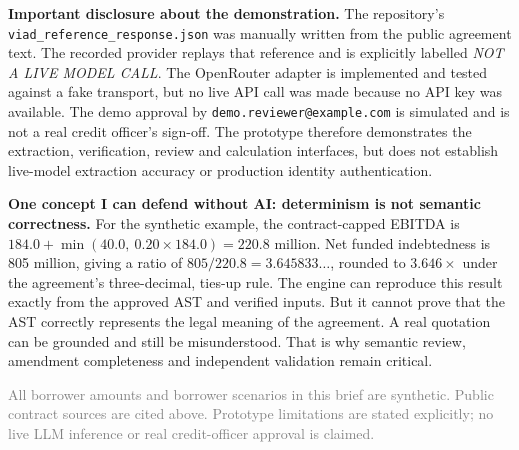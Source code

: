 \documentclass[10pt,letterpaper]{article}
\newcommand{\ct}[1]{\texttt{\small #1}}
\begin{document}
\textbf{Important disclosure about the demonstration.} The repository's \ct{viad\_reference\_response.json} was manually written from the public agreement text. The recorded provider replays that reference and is explicitly labelled \emph{NOT A LIVE MODEL CALL}. The OpenRouter adapter is implemented and tested against a fake transport, but no live API call was made because no API key was available. The demo approval by \ct{demo.reviewer@example.com} is simulated and is not a real credit officer's sign-off. The prototype therefore demonstrates the extraction, verification, review and calculation interfaces, but does not establish live-model extraction accuracy or production identity authentication.

\textbf{One concept I can defend without AI: determinism is not semantic correctness.} For the synthetic example, the contract-capped EBITDA is $184.0+\min(40.0,\ 0.20\times184.0)=220.8$ million. Net funded indebtedness is 805 million, giving a ratio of $805/220.8=3.645833\ldots$, rounded to $3.646\times$ under the agreement's three-decimal, ties-up rule. The engine can reproduce this result exactly from the approved AST and verified inputs. But it cannot prove that the AST correctly represents the legal meaning of the agreement. A real quotation can be grounded and still be misunderstood. That is why semantic review, amendment completeness and independent validation remain critical.

\medskip
{\footnotesize\textcolor{gray}{All borrower amounts and borrower scenarios in this brief are synthetic. Public contract sources are cited above. Prototype limitations are stated explicitly; no live LLM inference or real credit-officer approval is claimed.}}
\end{document}

